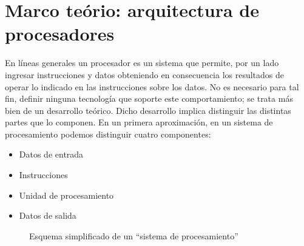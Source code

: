 \chapter{Marco teório: arquitectura de procesadores}
\label{ch:theory}

En líneas generales un procesador es un sistema que permite, por un lado
ingresar instrucciones y datos obteniendo en consecuencia los resultados de
operar lo indicado en las instrucciones sobre los datos. No es necesario para
tal fin, definir ninguna tecnología que soporte este comportamiento; se trata
más bien de un desarrollo teórico. Dicho desarrollo implica distinguir las
distintas partes que lo componen. En un primera aproximación, en un sistema de
procesamiento podemos distinguir cuatro componentes:

\begin{itemize}
  \item Datos de entrada
  \item Instrucciones
  \item Unidad de procesamiento
  \item Datos de salida
\end{itemize}

\begin{figure}
  \centering
  
  \captionsetup{justification=centering}
  \caption{Esquema simplificado de un ``sistema de procesamiento''}
  \label{fig:C02-sistema_de_procesamiento}
\end{figure}

